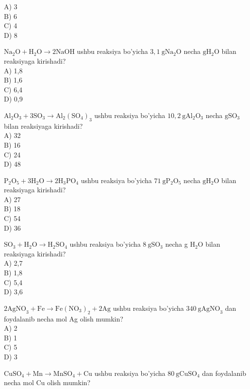 A) 3\\
B) 6\\
C) 4\\
D) 8
  \item $\mathrm{Na}_{2} \mathrm{O}+\mathrm{H}_{2} \mathrm{O} \rightarrow 2 \mathrm{NaOH}$ ushbu reaksiya bo'yicha $3,1 \mathrm{~g} \mathrm{Na}{ }_{2} \mathrm{O}$ necha $\mathrm{g} \mathrm{H}_{2} \mathrm{O}$ bilan reaksiyaga kirishadi?\\
A) 1,8\\
B) 1,6\\
C) 6,4\\
D) 0,9
  \item $\mathrm{Al}_{2} \mathrm{O}_{3}+3 \mathrm{SO}_{3} \rightarrow \mathrm{Al}_{2}\left(\mathrm{SO}_{4}\right)_{3}$ ushbu reaksiya bo'yicha $10,2 \mathrm{~g} \mathrm{Al}_{2} \mathrm{O}_{3}$ necha $\mathrm{g} \mathrm{SO}_{3}$ bilan reaksiyaga kirishadi?\\
A) 32\\
B) 16\\
C) 24\\
D) 48
  \item $\mathrm{P}_{2} \mathrm{O}_{5}+3 \mathrm{H}_{2} \mathrm{O} \rightarrow 2 \mathrm{H}_{3} \mathrm{PO}_{4}$ ushbu reaksiya bo'yicha $71 \mathrm{~g} \mathrm{P}_{2} \mathrm{O}_{5}$ necha $\mathrm{g} \mathrm{H}_{2} \mathrm{O}$ bilan reaksiyaga kirishadi?\\
A) 27\\
B) 18\\
C) 54\\
D) 36
  \item $\mathrm{SO}_{3}+\mathrm{H}_{2} \mathrm{O} \rightarrow \mathrm{H}_{2} \mathrm{SO}_{4}$ ushbu reaksiya bo'yicha $8 \mathrm{~g} \mathrm{SO}_{3}$ necha g $\mathrm{H}_{2} \mathrm{O}$ bilan reaksiyaga kirishadi?\\
A) 2,7\\
B) 1,8\\
C) 5,4\\
D) 3,6
  \item $2 \mathrm{AgNO}_{3}+\mathrm{Fe} \rightarrow \mathrm{Fe}\left(\mathrm{NO}_{3}\right)_{2}+2 \mathrm{Ag}$ ushbu reaksiya bo'yicha $340 \mathrm{~g} \mathrm{AgNO}_{3}$ dan foydalanib necha mol Ag olish mumkin?\\
A) 2\\
B) 1\\
C) 5\\
D) 3
  \item $\mathrm{CuSO}_{4}+\mathrm{Mn} \rightarrow \mathrm{MnSO}_{4}+\mathrm{Cu}$ ushbu reaksiya bo'yicha $80 \mathrm{~g} \mathrm{CuSO}_{4}$ dan foydalanib necha mol Cu olish mumkin?\\
